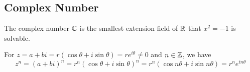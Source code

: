 \subsection{Complex Number}

The complex number $\mathbb{C}$ is the smallest extension field of $\mathbb{R}$ that $x^2 = -1$ is solvable.

\begin{theorem}
    For $z = a + b i = r(\cos \theta + i \sin \theta) = r e^{i \theta} \neq 0$ and $n \in \mathbb{Z}$, we have 
    \begin{equation}
        z^n = (a+bi)^n = r^n(\cos \theta + i \sin \theta)^n = r^n (\cos n\theta + i \sin n\theta) = r^n e^{in\theta}
    \end{equation}
\end{theorem}

